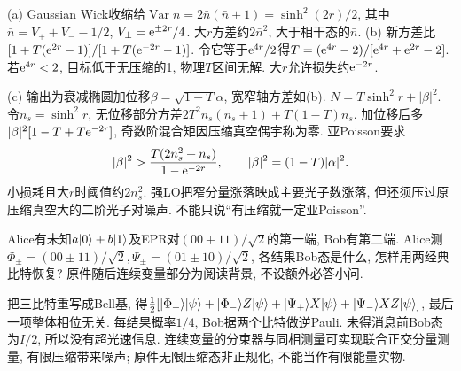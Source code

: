 \begin{solution}(a) Gaussian Wick收缩给$\operatorname{Var}n=2\bar n(\bar n+1)=\sinh^2(2r)/2$, 其中$\bar n=V_++V_--1/2$, $V_\pm=\mathrm e^{\pm2r}/4$. 大$r$方差约$2\bar n^2$, 大于相干态的$\bar n$. (b) 新方差比$[1+T(\mathrm e^{2r}-1)]/[1+T(\mathrm e^{-2r}-1)]$. 令它等于$\mathrm e^{4r}/2$得$T=(\mathrm e^{4r}-2)/[\mathrm e^{4r}+\mathrm e^{2r}-2]$. 若$\mathrm e^{4r}<2$, 目标低于无压缩的1, 物理$T$区间无解. 大$r$允许损失约$\mathrm e^{-2r}$.

(c) 输出为衰减椭圆加位移$\beta=\sqrt{1-T}\alpha$, 宽窄轴方差如(b). $N=T\sinh^2r+|\beta|^2$. 令$n_s=\sinh^2r$, 无位移部分方差$2T^2n_s(n_s+1)+T(1-T)n_s$. 加位移后多$|\beta|^2[1-T+T\mathrm e^{-2r}]$, 奇数阶混合矩因压缩真空偶宇称为零. 亚Poisson要求
\[|\beta|^2>\frac{T(2n_s^2+n_s)}{1-\mathrm e^{-2r}},\qquad |\beta|^2=(1-T)|\alpha|^2.\]
小损耗且大$r$时阈值约$2n_s^2$. 强LO把窄分量涨落映成主要光子数涨落, 但还须压过原压缩真空大的二阶光子对噪声. 不能只说“有压缩就一定亚Poisson”.
\end{solution}
\begin{exercise}Alice有未知$a\lvert 0\rangle+b\lvert 1\rangle$及EPR对$(00+11)/\sqrt2$的第一端, Bob有第二端. Alice测$\Phi_\pm=(00\pm11)/\sqrt2,\Psi_\pm=(01\pm10)/\sqrt2$, 各结果Bob态是什么, 怎样用两经典比特恢复? 原件随后连续变量部分为阅读背景, 不设额外必答小问.\end{exercise}
\begin{solution}把三比特重写成Bell基, 得$\frac12[\lvert \Phi_+\rangle\lvert \psi\rangle+\lvert \Phi_-\rangle Z\lvert \psi\rangle+\lvert \Psi_+\rangle X\lvert \psi\rangle+\lvert \Psi_-\rangle XZ\lvert \psi\rangle]$, 最后一项整体相位无关. 每结果概率$1/4$, Bob据两个比特做逆Pauli. 未得消息前Bob态为$I/2$, 所以没有超光速信息. 连续变量的分束器与同相测量可实现联合正交分量测量, 有限压缩带来噪声; 原件无限压缩态非正规化, 不能当作有限能量实物.
\end{solution}

